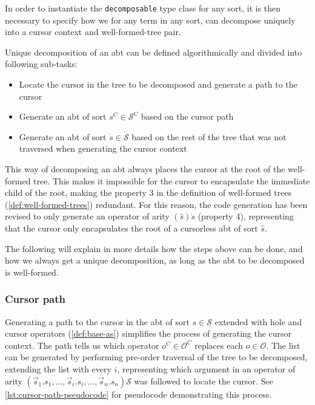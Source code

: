 In order to instantiate the \texttt{decomposable} type class for any sort,
it is then necessary to specify how we for any term in any sort,
can decompose uniquely into a cursor context and well-formed-tree pair.

Unique decomposition of an abt can be defined algorithmically and divided
into following sub-tasks:
\begin{itemize}
  \item Locate the cursor in the tree to be decomposed and generate a path to the cursor
  \item Generate an abt of sort $s^C \in \mathcal{S}^C$ based on the cursor path
  \item Generate an abt of sort $\dot{s} \in \dot{\mathcal{S}}$
        based on the rest of the tree that was not traversed
        when generating the cursor context
\end{itemize}

This way of decomposing an abt always places the cursor at the root of the
well-formed tree. This makes it impossible for the cursor to encapsulate the immediate
child of the root, making the property 3 in the definition of well-formed trees
(\cref{def:well-formed-trees}) redundant. For this reason, the code generation
has been revised to only generate an operator of arity $(\hat{s})\dot{s}$ (property 4),
representing that the cursor only encapsulates the root of a cursorless abt
of sort $\hat{s}$.

The following will explain in more details how the steps above can be done,
and how we always get a unique decomposition, as long as the abt to be decomposed is well-formed.

\subsubsection{Cursor path}

Generating a path to the cursor in the abt of sort $s \in \mathcal{S}$ extended with
hole and cursor operators (\cref{def:base-as})
simplifies the process of generating the cursor context. The path tells us
which operator $o^C \in \mathcal{O}^C$ replaces each $o \in \mathcal{O}$.
The list can be generated by performing pre-order traversal of the tree to be decomposed,
extending the list with every $i$, representing which argument in an operator of
arity $(\vec{s}_1.s_1, ... , \vec{s}_i.s_i, ..., \vec{s}_n.s_n)\mathcal{S}$ was
followed to locate the cursor. See \cref{lst:cursor-path-pseudocode} for pseudocode
demonstrating this process.

